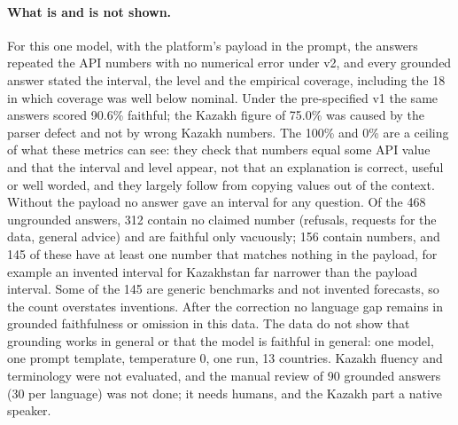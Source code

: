 \paragraph{What is and is not shown.} For this one model, with the platform's payload in the prompt, the answers repeated the API numbers with no numerical error under v2, and every grounded answer stated the interval, the level and the empirical coverage, including the 18 in which coverage was well below nominal. Under the pre-specified v1 the same answers scored 90.6\% faithful; the Kazakh figure of 75.0\% was caused by the parser defect and not by wrong Kazakh numbers. The 100\% and 0\% are a ceiling of what these metrics can see: they check that numbers equal some API value and that the interval and level appear, not that an explanation is correct, useful or well worded, and they largely follow from copying values out of the context. Without the payload no answer gave an interval for any question. Of the 468 ungrounded answers, 312 contain no claimed number (refusals, requests for the data, general advice) and are faithful only vacuously; 156 contain numbers, and 145 of these have at least one number that matches nothing in the payload, for example an invented interval for Kazakhstan far narrower than the payload interval. Some of the 145 are generic benchmarks and not invented forecasts, so the count overstates inventions. After the correction no language gap remains in grounded faithfulness or omission in this data. The data do not show that grounding works in general or that the model is faithful in general: one model, one prompt template, temperature 0, one run, 13 countries. Kazakh fluency and terminology were not evaluated, and the manual review of 90 grounded answers (30 per language) was not done; it needs humans, and the Kazakh part a native speaker.
